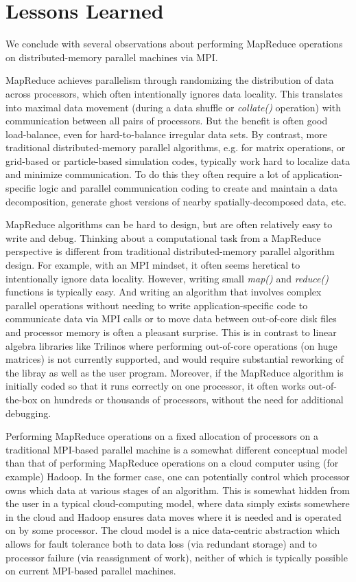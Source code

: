 \section{Lessons Learned}
\label{sec:lessons}

We conclude with several observations about performing MapReduce
operations on distributed-memory parallel machines via MPI.

MapReduce achieves parallelism through randomizing the distribution of
data across processors, which often intentionally ignores data
locality.  This translates into maximal data movement (during a data
shuffle or {\it collate()} operation) with communication between all
pairs of processors.  But the benefit is often good load-balance, even
for hard-to-balance irregular data sets.  By contrast, more
traditional distributed-memory parallel algorithms, e.g. for matrix
operations, or grid-based or particle-based simulation codes,
typically work hard to localize data and minimize communication.  To
do this they often require a lot of application-specific logic and
parallel communication coding to create and maintain a data
decomposition, generate ghost versions of nearby spatially-decomposed
data, etc.

MapReduce algorithms can be hard to design, but are often relatively
easy to write and debug.  Thinking about a computational task from a
MapReduce perspective is different from traditional distributed-memory
parallel algorithm design.  For example, with an MPI mindset, it often
seems heretical to intentionally ignore data locality.  However,
writing small {\it map()} and {\it reduce()} functions is typically
easy.  And writing an algorithm that involves complex parallel
operations without needing to write application-specific code to
communicate data via MPI calls or to move data between out-of-core
disk files and processor memory is often a pleasant surprise.  This is
in contrast to linear algebra libraries like Trilinos where performing
out-of-core operations (on huge matrices) is not currently supported,
and would require substantial reworking of the libray as well as the
user program.  Moreover, if the MapReduce algorithm is initially coded
so that it runs correctly on one processor, it often works
out-of-the-box on hundreds or thousands of processors, without the
need for additional debugging.

Performing MapReduce operations on a fixed allocation of processors on
a traditional MPI-based parallel machine is a somewhat different
conceptual model than that of performing MapReduce operations on a
cloud computer using (for example) Hadoop.  In the former case, one
can potentially control which processor owns which data at various
stages of an algorithm.  This is somewhat hidden from the user in a
typical cloud-computing model, where data simply exists somewhere in
the cloud and Hadoop ensures data moves where it is needed and is
operated on by some processor.  The cloud model is a nice data-centric
abstraction which allows for fault tolerance both to data loss (via
redundant storage) and to processor failure (via reassignment of
work), neither of which is typically possible on current MPI-based
parallel machines.

